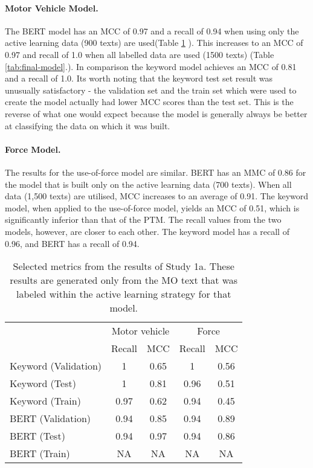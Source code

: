 \paragraph{Motor Vehicle Model.} The BERT model has an MCC of 0.97 and a recall of 0.94 when using only the active learning data (900 texts) are used(Table \ref{tab:results_study_1} ). This increases to an MCC of 0.97 and recall of 1.0 when all labelled data are used (1500 texts) (Table \ref{tab:final-model}.). In comparison the keyword model achieves an MCC of 0.81 and a recall of 1.0. Its worth noting that the keyword test set result was unusually satisfactory - the validation set and the train set which were used to create the model actually had lower MCC scores than the test set. This is the reverse of what one would expect because the model is generally always be better at classifying the data on which it was built.

\paragraph{Force Model.} The results for the use-of-force model are similar. BERT has an MMC of 0.86 for the model that is built only on the active learning data (700 texts). When all data (1,500 texts) are utilised, MCC increases to an average of 0.91. The keyword model, when applied to the use-of-force model, yields an MCC of 0.51, which is significantly inferior than that of the PTM. The recall values from the two models, however, are closer to each other. The keyword model has a recall of 0.96, and BERT has a recall of 0.94.

\begin{table}[]
\begin{tabular}{@{}lcccc@{}}
\toprule
                         & \multicolumn{2}{c}{Motor vehicle} & \multicolumn{2}{c}{Force} \\ 
                         & Recall           & MCC            & Recall       & MCC        \\\midrule
Keyword (Validation)     & 1                & 0.65           & 1            & 0.56       \\
Keyword (Test)           & 1                & 0.81           & 0.96         & 0.51       \\
Keyword (Train)          & 0.97             & 0.62           & 0.94         & 0.45       \\\midrule
BERT (Validation)        & 0.94                & 0.85           & 0.94            & 0.89          \\
BERT (Test)              & 0.94                & 0.97           &0.94           & 0.86         \\
BERT (Train)             & NA               & NA             & NA           & NA         \\ \bottomrule
\end{tabular}
\caption[Model metrics. PF1 data. Force used and motor vehicle model.]{\label{tab:results_study_1} Selected metrics from the results of Study 1a. These results are generated only from the MO text that was labeled within the active learning strategy for that model.}
\end{table}


